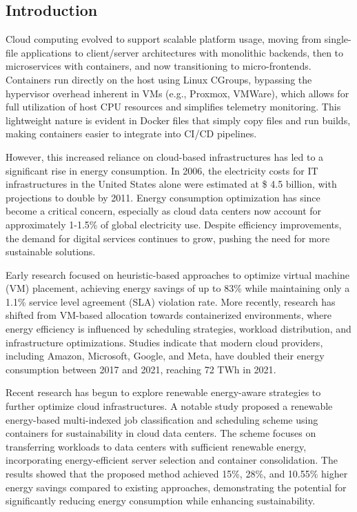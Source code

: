 \begin{multicols}{2}
\tableofcontents
\section{Introduction}
Cloud computing evolved to support scalable platform usage, moving from single-file applications to client/server 
architectures with monolithic backends, then to microservices with containers, and now transitioning to micro-frontends. 
Containers run directly on the host using Linux CGroups, bypassing the hypervisor overhead inherent in VMs (e.g., 
Proxmox, VMWare), which allows for full utilization of host CPU resources and simplifies telemetry monitoring. 
This lightweight nature is evident in Docker files that simply copy files and run builds, making containers easier to integrate 
into CI/CD pipelines.

However, this increased reliance on cloud-based infrastructures has led to a significant rise in energy 
consumption. In 2006, the electricity costs for IT infrastructures in the United States alone were 
estimated at \$ 4.5 billion, with projections to double by 2011\cite{beloglazov_energy_2010}. Energy 
consumption optimization has since become a critical concern, especially as cloud data centers now account 
for approximately 1-1.5\% of global electricity use\cite{IEADataCentres}. Despite efficiency improvements, the 
demand for digital services continues to grow, pushing the need for more sustainable solutions.

Early research focused on heuristic-based approaches to optimize virtual machine (VM) placement, achieving 
energy savings of up to 83\% while maintaining only a 1.1\% service level agreement (SLA) violation 
rate\cite{beloglazov_energy_2010}. More recently, research has shifted from VM-based allocation towards 
containerized environments, where energy efficiency is influenced by scheduling strategies, workload 
distribution, and infrastructure optimizations. Studies indicate that modern cloud providers, including 
Amazon, Microsoft, Google, and Meta, have doubled their energy consumption between 2017 and 2021, 
reaching 72 TWh in 2021\cite{masanet_2020, hintemann_2022, IEADataCentres}.

Recent research has begun to explore renewable energy-aware strategies to further optimize cloud infrastructures. A notable study proposed a renewable energy-based multi-indexed job classification and scheduling scheme using containers for sustainability in cloud data centers\cite{kumar_renewable_2019}. The scheme focuses on transferring workloads to data centers with sufficient renewable energy, incorporating energy-efficient server selection and container consolidation. The results showed that the proposed method achieved 15\%, 28\%, and 10.55\% higher energy savings compared to existing approaches, demonstrating the potential for significantly reducing energy consumption while enhancing sustainability.


\end{multicols}
